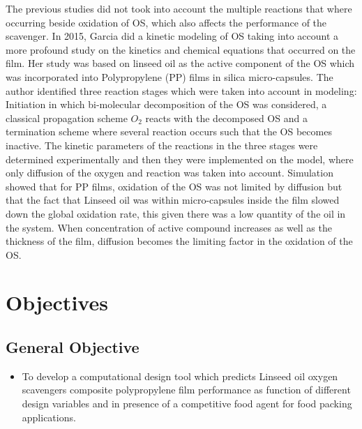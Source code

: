 \begin{refsection}
The previous studies did not took into account the multiple reactions that where occurring beside oxidation of OS, which also affects the performance of the scavenger. In 2015, Garcia \cite{GarciaMora2015KineticScavengers}  did a kinetic modeling of OS taking into account a more profound study on the kinetics and chemical equations that occurred on the film. Her study was based on linseed oil as the active component of the OS which was incorporated into Polypropylene (PP) films in silica micro-capsules. The author identified  three reaction stages which were taken into account in modeling: Initiation in which  bi-molecular decomposition of the OS was considered,  a classical propagation scheme $O_2$ reacts with the decomposed OS and a termination scheme where several reaction occurs such that the OS becomes inactive. The kinetic parameters of the reactions in the three stages were determined experimentally and then they were implemented on the model, where only diffusion of the oxygen and reaction was taken into account. Simulation showed that for PP films, oxidation of the OS was not limited by diffusion but that the fact that Linseed oil was within micro-capsules inside the film slowed down the global oxidation rate, this given there was a low quantity of the oil in the system. When concentration of active compound increases as well as the thickness of the film, diffusion becomes the limiting factor in the oxidation of the OS.

\section{Objectives}\label{sec:objectives}

\subsection{General Objective}
\begin{itemize}
    \item To develop a computational design tool which predicts Linseed oil oxygen scavengers composite polypropylene film performance as function of different design variables and in presence of a competitive food agent for food packing applications.
\end{itemize}


\end{refsection}
